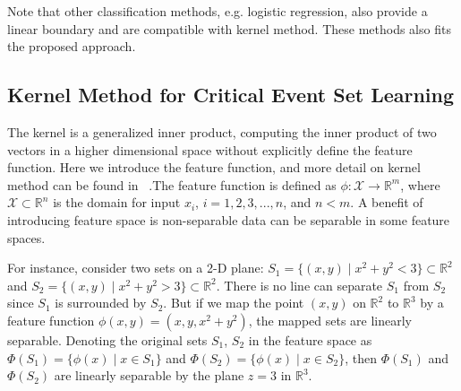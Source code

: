 \documentclass[letterpaper, 10 pt, journal]{IEEEtran}  %
\begin{document}
Note that other classification methods, e.g. logistic regression, also provide a linear boundary and are compatible with kernel method. These methods also fits the proposed approach.

\subsection{Kernel Method for Critical Event Set Learning}\label{sec:kernel}

The kernel is a generalized inner product, computing the inner product of two vectors in a higher dimensional space without explicitly define the feature function. Here we introduce the feature function, and more detail on kernel method can be found in~\cite{murphy2012machine} .The feature function is defined as $\phi:\mathcal{X} \rightarrow \mathbb{R}^m$, where $\mathcal{X} \subset \mathbb{R}^n$ is the domain for input $x_i$, $  i=1,2,3,...,n$, and $n<m$. A benefit of introducing feature space is non-separable data can be separable in some feature spaces. 

For instance, consider two sets on a 2-D plane: $S_1 = \{(x,y) \mid x^2+y^2 < 3\} \subset \mathbb{R}^2 $ and $S_2 = \{(x,y) \mid x^2+y^2 > 3\}\subset \mathbb{R}^2 $. There is no line can separate $S_1$ from $S_2$ since $S_1$ is surrounded by $S_2$. But if we map the point $(x,y)$ on $\mathbb{R}^2$ to $\mathbb{R}^3$ by a feature function $\phi(x,y) = (x,y,x^2+y^2)$, the mapped sets are linearly separable. Denoting the original sets $S_1$, $ S_2$ in the feature space as $\Phi(S_1) = \{\phi(x) \mid x \in S_1 \}$ and $\Phi(S_2) = \{\phi(x) \mid x \in S_2 \}$, then $\Phi(S_1)$ and $\Phi(S_2)$ are linearly separable by the plane $z = 3$ in $\mathbb{R}^3$. 










%

\end{document}
